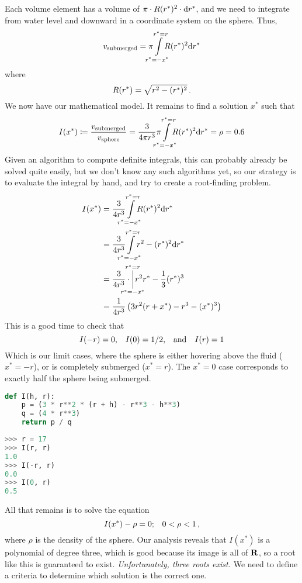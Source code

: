 \documentclass[12pt]{article}
\begin{document}
\begin{multicols}{2}
Each volume element has a volume of $\pi \cdot R(r^*)^2 \cdot \mathrm{d} r^*$,
and we need to integrate from water level and downward in a
coordinate system on the sphere.
Thus,
\begin{equation}
    v_\text{submerged} =
        \pi \int\limits_{\mathclap{r^* = -x^*}}^{\mathclap{r^* = r}}R(r^*)^2 \D r^*
\end{equation}
where
\[
    R(r^*) = \sqrt{r^2 - (r^*)^2} \,\text.
\]
We now have our mathematical model.
It remains to find a solution $x^*$ such that
\[
    I(x^*) \coloneqq \frac{v_\text{submerged}}{v_\text{sphere}}
    = \frac{3}{4 \pi r^3}
        \pi \int\limits_{\mathclap{r^* = -x^*}}^{\mathclap{r^* = r}}R(r^*)^2 \D r^*
    = \rho = 0.6
\]
Given an algorithm to compute definite integrals, this can probably already be
solved quite easily, but we don't know any such algorithms yet,
so our strategy is to evaluate the integral by hand, and try
to create a root-finding problem.
\begin{align*}
    I(x^*) &= \frac{3}{4 r^3}
        \int\limits_{\mathclap{r^* = -x^*}}^{\mathclap{r^* = r}}R(r^*)^2 \D r^* \\
    &= \frac{3}{4 r^3}
        \int\limits_{\mathclap{r^* = -x^*}}^{\mathclap{r^* = r}}
            r^2 - (r^*)^2 \D r^* \\
    &= \frac{3}{4 r^3} \cdot
    \smashoperator{\Sub\limits_{r^* = -x^*}^{r^* = r}}r^2 r^* - \frac{1}{3}(r^*)^3 \\
    &= \frac{1}{4 r^3} \left(
    3r^2(r + x^*) - r^3 - (x^*)^3
    \right)
\end{align*}
This is a good time to check that
\[
        I(-r) = 0\text, \quad
        I(0) = 1/2\text, \quad \text{and} \quad
        I(r) = 1
\]
Which is our limit cases, where the sphere is either hovering
above the fluid ($x^* = -r$), or is completely submerged ($x^* = r$).
The $x^* = 0$ case corresponds to exactly half the sphere
being submerged.
\begin{lstlisting}[language=Python, caption={Checking for a given radius}]
def I(h, r):
    p = (3 * r**2 * (r + h) - r**3 - h**3)
    q = (4 * r**3)
    return p / q
\end{lstlisting}
\vspace{-0.5\baselineskip}
\begin{lstlisting}[language=Python, frame=b,numbers=none]
>>> r = 17
>>> I(r, r)
1.0
>>> I(-r, r)
0.0
>>> I(0, r)
0.5
\end{lstlisting}
All that remains is to solve the equation
\[
    I(x^*) - \rho = 0\text; \quad 0 < \rho < 1 \,\text,
\]
where $\rho$ is the density of the sphere.
Our analysis reveals that $I(x^*)$ is a polynomial of degree three,
which is good because its image is all of $\mathbf{R}$, so a root like this is guaranteed
to exist. {\em Unfortunately, three roots exist.}
We need to define a criteria to determine which solution is the correct one.


\end{multicols}
\end{document}
